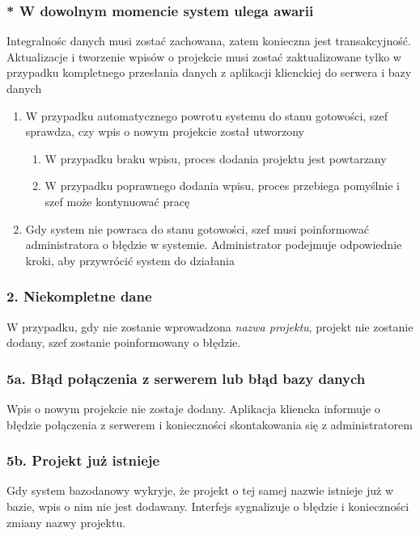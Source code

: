 \documentclass{article}
\begin{document}
    \subsubsection*{* W dowolnym momencie system ulega awarii}
    Integralnośc danych musi zostać zachowana, zatem konieczna jest transakcyjność. Aktualizacje
    i tworzenie wpisów o projekcie musi zostać zaktualizowane tylko w przypadku kompletnego przesłania
    danych z aplikacji klienckiej do serwera i bazy danych
    \begin{enumerate}
        \item W przypadku automatycznego powrotu systemu do stanu gotowości, szef sprawdza, czy wpis o nowym projekcie został utworzony
    \begin{enumerate}
            \item W przypadku braku wpisu, proces dodania projektu jest powtarzany
            \item W przypadku poprawnego dodania wpisu, proces przebiega pomyślnie i szef może kontynuować pracę
        \end{enumerate}
        \item Gdy system nie powraca do stanu gotowości, szef musi poinformować administratora o błędzie w systemie. Administrator podejmuje odpowiednie kroki, aby przywrócić system do działania
    \end{enumerate}

    \subsubsection*{2. Niekompletne dane}
    W przypadku, gdy nie zostanie wprowadzona \textit{nazwa projektu}, projekt nie zostanie dodany, szef zostanie poinformowany o błędzie.

    \subsubsection*{5a. Błąd połączenia z serwerem lub błąd bazy danych}
    Wpis o nowym projekcie nie zostaje dodany. Aplikacja kliencka informuje o błędzie połączenia z serwerem i konieczności skontakowania się z administratorem

    \subsubsection*{5b. Projekt już istnieje}
    Gdy system bazodanowy wykryje, że projekt o tej samej nazwie istnieje już w bazie, wpis o nim nie jest dodawany. Interfejs sygnalizuje o błędzie i konieczności zmiany nazwy projektu.
\end{document}
